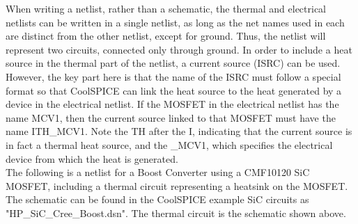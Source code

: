 When writing a netlist, rather than a schematic, the thermal and electrical netlists can be written in a single netlist, as long as the net names used in each are distinct from the other netlist, except for ground. Thus, the netlist will represent two circuits, connected only through ground. In order to include a heat source in the thermal part of the netlist, a current source (ISRC) can be used. However, the key part here is that the name of the ISRC must follow a special format so that CoolSPICE can link the heat source to the heat generated by a device in the electrical netlist. If the MOSFET in the electrical netlist has the name {\selectfont MCV1}, then the current source linked to that MOSFET must have the name {\selectfont ITH\_MCV1}. Note the {\selectfont TH} after the {\selectfont I}, indicating that the current source is in fact a thermal heat source, and the {\selectfont \_MCV1}, which specifies the electrical device from which the heat is generated. \\

The following is a netlist for a Boost Converter using a CMF10120 SiC MOSFET, including a thermal circuit representing a heatsink on the MOSFET. The schematic can be found in the CoolSPICE example SiC circuits as "HP\_SiC\_Cree\_Boost.dsn". The thermal circuit is the schematic shown above. \\

